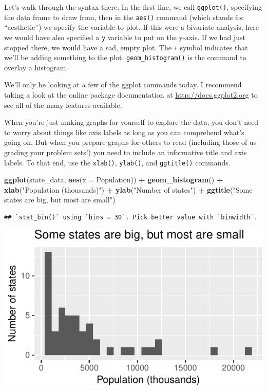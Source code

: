 \documentclass[
  12pt,
  oneside,openany]{book}
\newenvironment{Shaded}{\begin{snugshade}}{\end{snugshade}}
\newcommand{\DataTypeTok}[1]{\textcolor[rgb]{0.13,0.29,0.53}{#1}}
\newcommand{\KeywordTok}[1]{\textcolor[rgb]{0.13,0.29,0.53}{\textbf{#1}}}
\newcommand{\NormalTok}[1]{#1}
\newcommand{\OperatorTok}[1]{\textcolor[rgb]{0.81,0.36,0.00}{\textbf{#1}}}
\newcommand{\StringTok}[1]{\textcolor[rgb]{0.31,0.60,0.02}{#1}}
\begin{document}
Let's walk through the syntax there. In the first line, we call \texttt{ggplot()}, specifying the data frame to draw from, then in the \texttt{aes()} command (which stands for ``aesthetic'') we specify the variable to plot. If this were a bivariate analysis, here we would have also specified a \texttt{y} variable to put on the y-axis. If we had just stopped there, we would have a sad, empty plot. The \texttt{+} symbol indicates that we'll be adding something to the plot. \texttt{geom\_histogram()} is the command to overlay a histogram.

We'll only be looking at a few of the ggplot commands today. I recommend taking a look at the online package documentation at \url{http://docs.ggplot2.org} to see all of the many features available.

When you're just making graphs for yourself to explore the data, you don't need to worry about things like axis labels as long as you can comprehend what's going on. But when you prepare graphs for others to read (including those of us grading your problem sets!) you need to include an informative title and axis labels. To that end, use the \texttt{xlab()}, \texttt{ylab()}, and \texttt{ggtitle()} commands.

\begin{Shaded}
\begin{Highlighting}[]
\KeywordTok{ggplot}\NormalTok{(state\_data, }\KeywordTok{aes}\NormalTok{(}\DataTypeTok{x =}\NormalTok{ Population)) }\OperatorTok{+}
\StringTok{  }\KeywordTok{geom\_histogram}\NormalTok{() }\OperatorTok{+}
\StringTok{  }\KeywordTok{xlab}\NormalTok{(}\StringTok{"Population (thousands)"}\NormalTok{) }\OperatorTok{+}
\StringTok{  }\KeywordTok{ylab}\NormalTok{(}\StringTok{"Number of states"}\NormalTok{) }\OperatorTok{+}
\StringTok{  }\KeywordTok{ggtitle}\NormalTok{(}\StringTok{"Some states are big, but most are small"}\NormalTok{)}
\end{Highlighting}
\end{Shaded}

\begin{verbatim}
## `stat_bin()` using `bins = 30`. Pick better value with `binwidth`.
\end{verbatim}

\includegraphics{pdaps_files/figure-latex/axis-labeling-1.pdf}
\end{document}
